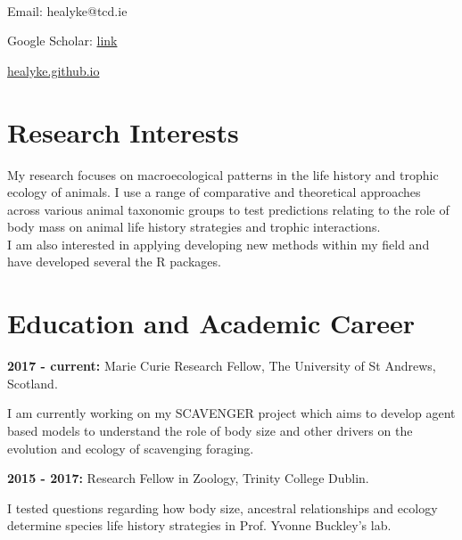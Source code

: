 \documentclass[10pt,a4paper]{article}
\newcommand\textbox[1]{%
  \parbox{.333\textwidth}{#1}%
}
\begin{document}
\par{\smallskip\par}

\large{}\\
\bigskip

\noindent\textbox{Email: healyke@tcd.ie\hfill}\textbox{\hfil Google Scholar: \href{http://scholar.google.com/citations?user=5Kb9u8EAAAAJ}{link} \hfil}\textbox{\hfill \href{http://healyke.github.io}{healyke.github.io}}


\bigskip


\section{\textbf{Research Interests}}
\raggedright	
My research focuses on macroecological patterns in the life history and trophic ecology of animals. I use a range of comparative and theoretical approaches across various animal taxonomic groups to test predictions relating to the role of body mass on animal life history strategies and trophic interactions.\\ 
I am also interested in applying  developing new methods within my field and have developed several the R packages.
\bigskip



\section{\textbf{Education and Academic Career}}

\raggedright	
\textbf{2017 - current:} Marie Curie Research Fellow, The University of St Andrews, Scotland.
 \smallskip
\par{\fontsize{10.5}{10} I am currently working on my SCAVENGER project which aims to develop agent based models to understand the role of body size and other drivers on the evolution and ecology of scavenging foraging.
\bigskip}

\raggedright	
\textbf{2015 - 2017:} Research Fellow in Zoology, Trinity College Dublin.
 \smallskip
\par{\fontsize{10.5}{10} I tested questions regarding how body size, ancestral relationships and ecology determine species life history strategies in Prof. Yvonne Buckley's lab.\bigskip}
\end{document}
